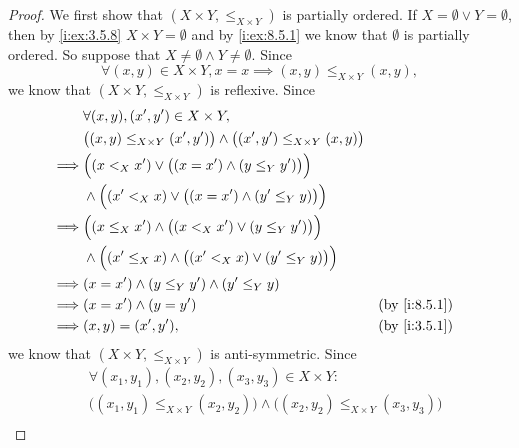 \begin{proof}
  We first show that \((X \times Y, \leq_{X \times Y})\) is partially ordered.
  If \(X = \emptyset \lor Y = \emptyset\), then by \cref{i:ex:3.5.8} \(X \times Y = \emptyset\) and by \cref{i:ex:8.5.1} we know that \(\emptyset\) is partially ordered.
  So suppose that \(X \neq \emptyset \land Y \neq \emptyset\).
  Since
  \[
    \forall (x, y) \in X \times Y, x = x \implies (x, y) \leq_{X \times Y} (x, y),
  \]
  we know that \((X \times Y, \leq_{X \times Y})\) is reflexive.
  Since
  \begin{align*}
             & \forall (x, y), (x', y') \in X \times Y,                                                                        \\
             & \big((x, y) \leq_{X \times Y} (x', y')\big) \land \big((x', y') \leq_{X \times Y} (x, y)\big)                   \\
    \implies & \Big((x <_X x') \lor \big((x = x') \land (y \leq_Y y')\big)\Big)                                                \\
             & \land \Big((x' <_X x) \lor \big((x = x') \land (y' \leq_Y y)\big)\Big)                                          \\
    \implies & \Big((x \leq_X x') \land \big((x <_X x') \lor (y \leq_Y y')\big)\Big)                                           \\
             & \land \Big((x' \leq_X x) \land \big((x' <_X x) \lor (y' \leq_Y y)\big)\Big)                                     \\
    \implies & (x = x') \land (y \leq_Y y') \land (y' \leq_Y y)                                                                \\
    \implies & (x = x') \land (y = y')                                                                       &  & \by{i:8.5.1} \\
    \implies & (x, y) = (x', y'),                                                                            &  & \by{i:3.5.1}
  \end{align*}
  we know that \((X \times Y, \leq_{X \times Y})\) is anti-symmetric.
  Since
  \begin{align*}
             & \forall (x_1, y_1), (x_2, y_2), (x_3, y_3) \in X \times Y :                                                                 \\
             & \big((x_1, y_1) \leq_{X \times Y} (x_2, y_2)\big) \land \big((x_2, y_2) \leq_{X \times Y} (x_3, y_3)\big)                   \\

\end{align*}
\end{proof}
